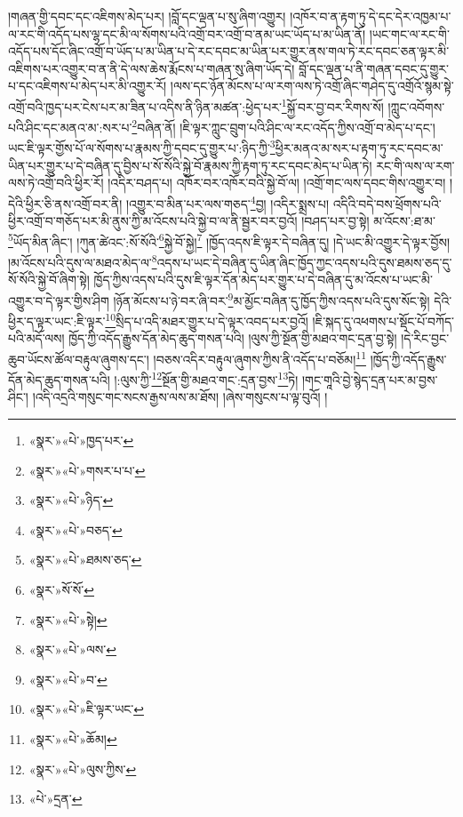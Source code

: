 །གཞན་གྱི་དབང་དང་འཇིགས་མེད་པར། །བློ་དང་ལྡན་པ་སུ་ཞིག་འགྱུར། །འཁོར་བ་ན་རྟག་ཏུ་དེ་དང་དེར་འཁྱམ་པ་ལ་རང་གི་འདོད་པས་ལྷ་དང་མི་ལ་སོགས་པའི་འགྲོ་བར་འགྲོ་བ་ནམ་ཡང་ཡོད་པ་མ་ཡིན་ནོ། །ཡང་གང་ལ་རང་གི་འདོད་པས་དོང་ཞིང་འགྲོ་བ་ཡོད་པ་མ་ཡིན་པ་དེ་རང་དབང་མ་ཡིན་པར་གྱུར་ནས་གལ་ཏེ་རང་དབང་ཅན་ལྟར་མི་འཇིགས་པར་འགྱུར་བ་ན་ནི་དེ་ལས་ཆེས་རྨོངས་པ་གཞན་སུ་ཞིག་ཡོད་དེ། བློ་དང་ལྡན་པ་ནི་གཞན་དབང་དུ་གྱུར་པ་དང་འཇིགས་པ་མེད་པར་མི་འགྱུར་རོ། །ལས་དང་ཉོན་མོངས་པ་ལ་རག་ལས་ཏེ་འགྲོ་ཞིང་གཤེད་དུ་འགྲོའོ་སྙམ་སྟེ་འགྲོ་བའི་ཁྱད་པར་ངེས་པར་མ་ཟིན་པ་འདིས་ནི་ཉིན་མཚན་:ཕྱེད་པར་\footnote{«སྣར་»«པེ་»ཁྱད་པར་}སྐྱོ་བར་བྱ་བར་རིགས་སོ། །ཀླུང་འབོགས་པའི་ཤིང་དང་མནའ་མ་:སར་པ་\footnote{«སྣར་»«པེ་»གསར་པ་པ་}བཞིན་ནོ། །ཇི་ལྟར་ཀླུང་བྲུག་པའི་ཤིང་ལ་རང་འདོད་ཀྱིས་འགྲོ་བ་མེད་པ་དང་། ཡང་ཇི་ལྟར་གྱོས་པོ་ལ་སོགས་པ་རྣམས་ཀྱི་དབང་དུ་གྱུར་པ་:ཉིད་ཀྱི་\footnote{«སྣར་»«པེ་»ཉིད་}ཕྱིར་མནའ་མ་སར་པ་རྟག་ཏུ་རང་དབང་མ་ཡིན་པར་གྱུར་པ་དེ་བཞིན་དུ་བྱིས་པ་སོ་སོའི་སྐྱེ་བོ་རྣམས་ཀྱི་རྟག་ཏུ་རང་དབང་མེད་པ་ཡིན་ཏེ། རང་གི་ལས་ལ་རག་ལས་ཏེ་འགྲོ་བའི་ཕྱིར་རོ། །འདིར་བཤད་པ། འཁོར་བར་འཁོར་བའི་སྐྱེ་བོ་ལ། །འགྲོ་གང་ལས་དབང་གིས་འགྱུར་བ། །དེའི་ཕྱིར་ཅི་ནས་འགྲོ་བར་ནི། །འགྱུར་བ་མིན་པར་ལས་གཅད་\footnote{«སྣར་»«པེ་»བཅད་}བྱ། །འདིར་སྨྲས་པ། འདིའི་བདེ་བས་ཕྲོགས་པའི་ཕྱིར་འགྲོ་བ་གཅོད་པར་མི་ནུས་ཀྱི་མ་འོངས་པའི་སྐྱེ་བ་ལ་ནི་སྦྱར་བར་བྱའོ། །བཤད་པར་བྱ་སྟེ། མ་འོངས་:ཐ་མ་\footnote{«སྣར་»«པེ་»ཐམས་ཅད་}ཡོད་མིན་ཞིང་། །ཀུན་ཚེའང་:སོ་སོའི་\footnote{«སྣར་»སོ་སོ་}སྐྱེ་བོ་སྐྱེ།\footnote{«སྣར་»«པེ་»སྟེ།} །ཁྱོད་འདས་ཇི་ལྟར་དེ་བཞིན་དུ། །དེ་ཡང་མི་འགྱུར་དེ་ལྟར་བྱོས། །མ་འོངས་པའི་དུས་ལ་མཐའ་མེད་ལ་\footnote{«སྣར་»«པེ་»ལས་}འདས་པ་ཡང་དེ་བཞིན་དུ་ཡིན་ཞིང་ཁྱོད་ཀྱང་འདས་པའི་དུས་ཐམས་ཅད་དུ་སོ་སོའི་སྐྱེ་བོ་ཞིག་སྟེ། ཁྱོད་ཀྱིས་འདས་པའི་དུས་ཇི་ལྟར་དོན་མེད་པར་གྱུར་པ་དེ་བཞིན་དུ་མ་འོངས་པ་ཡང་མི་འགྱུར་བ་དེ་ལྟར་གྱིས་ཤིག །ཉོན་མོངས་པ་ཉེ་བར་ཞི་བར་\footnote{«སྣར་»«པེ་»བ་}མ་མྱོང་བཞིན་དུ་ཁྱོད་ཀྱིས་འདས་པའི་དུས་སོང་སྟེ། དེའི་ཕྱིར་ད་ལྟར་ཡང་:ཇི་ལྟར་\footnote{«སྣར་»«པེ་»ཇི་ལྟར་ཡང་}སྲིད་པ་འདི་མཐར་གྱུར་པ་དེ་ལྟར་འབད་པར་བྱའོ། །ཇི་སྐད་དུ་འཕགས་པ་སྡོང་པོ་བཀོད་པའི་མདོ་ལས། ཁྱོད་ཀྱི་འདོད་རྒྱུས་དོན་མེད་ཆུད་གསན་པའི། །ལུས་ཀྱི་སྔོན་གྱི་མཐའ་གང་དྲན་བྱ་སྟེ། །དེ་རིང་བྱང་ཆུབ་ཡོངས་ཚོལ་བརྟུལ་ཞུགས་དང་། །བཅས་འདིར་བརྟུལ་ཞུགས་ཀྱིས་ནི་འདོད་པ་བཅོམ།\footnote{«སྣར་»«པེ་»ཆོམ།} །ཁྱོད་ཀྱི་འདོད་རྒྱུས་དོན་མེད་ཆུད་གསན་པའི། །:ལུས་ཀྱི་\footnote{«སྣར་»«པེ་»ལུས་ཀྱིས་}སྔོན་གྱི་མཐའ་གང་:དྲན་བྱས་\footnote{«པེ་»དྲན་}ཏེ། །གང་གཱའི་བྱེ་སྙེད་དྲན་པར་མ་བྱས་ཤིང་། །འདི་འདྲའི་གསུང་གང་སངས་རྒྱས་ལས་མ་ཐོས། །ཞེས་གསུངས་པ་ལྟ་བུའོ། །
